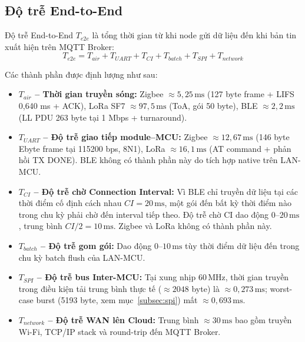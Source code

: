         \subsection{Độ trễ End-to-End}
        
        Độ trễ End-to-End $T_{e2e}$ là tổng thời gian từ khi node gửi dữ liệu đến khi bản tin xuất hiện trên MQTT Broker:
        \[ T_{e2e} = T_{air} + T_{UART} + T_{CI} + T_{batch} + T_{SPI} + T_{network} \]
        
        Các thành phần được định lượng như sau:
        
        \begin{itemize}
            \item \textbf{$T_{air}$ -- Thời gian truyền sóng:} Zigbee $\approx 5{,}25\,\text{ms}$ (127 byte frame + LIFS 0,640 ms + ACK), LoRa SF7 $\approx 97{,}5\,\text{ms}$ (ToA, gói 50 byte), BLE $\approx 2{,}2\,\text{ms}$ (LL PDU 263 byte tại 1 Mbps + turnaround).
            \item \textbf{$T_{UART}$ -- Độ trễ giao tiếp module--MCU:} Zigbee $\approx 12{,}67\,\text{ms}$ (146 byte Ebyte frame tại 115200 bps, 8N1), LoRa $\approx 16{,}1\,\text{ms}$ (AT command + phản hồi TX DONE). BLE không có thành phần này do tích hợp native trên LAN-MCU.
            \item \textbf{$T_{CI}$ -- Độ trễ chờ Connection Interval:} Vì BLE chỉ truyền dữ liệu tại các thời điểm cố định cách nhau $CI = 20\,\text{ms}$, một gói đến bất kỳ thời điểm nào trong chu kỳ phải chờ đến interval tiếp theo. Độ trễ chờ CI dao động $0$--$20\,\text{ms}$, trung bình $CI/2 = 10\,\text{ms}$. Zigbee và LoRa không có thành phần này.
            \item \textbf{$T_{batch}$ -- Độ trễ gom gói:} Dao động $0$--$10\,\text{ms}$ tùy thời điểm dữ liệu đến trong chu kỳ batch flush của LAN-MCU.
            \item \textbf{$T_{SPI}$ -- Độ trễ bus Inter-MCU:} Tại xung nhịp 60\,MHz, thời gian truyền trong điều kiện tải trung bình thực tế ($\approx 2048$ byte) là $\approx 0{,}273\,\text{ms}$; worst-case burst (5193 byte, xem mục~\ref{subsec:spi}) mất $\approx 0{,}693\,\text{ms}$.
            \item \textbf{$T_{network}$ -- Độ trễ WAN lên Cloud:} Trung bình $\approx 30\,\text{ms}$ bao gồm truyền Wi-Fi, TCP/IP stack và round-trip đến MQTT Broker.
        \end{itemize}
        
        
